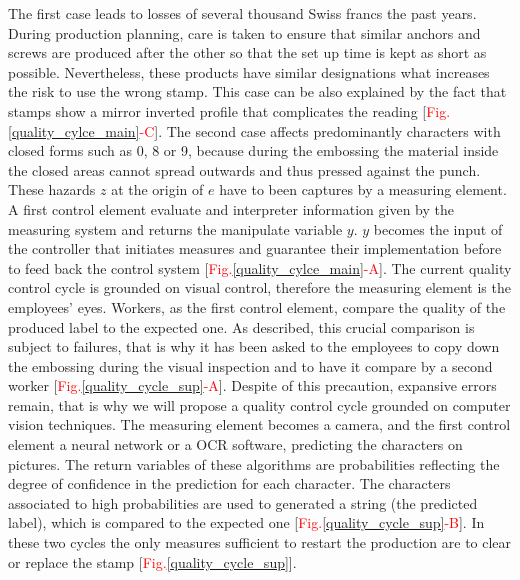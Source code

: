 \documentclass[12pt, french, a4paper]{article} %
\begin{document}
The first case leads to losses of several thousand Swiss francs the past years. During production planning, care is taken to ensure that similar anchors and screws are produced after the other so that the set up time is kept as short as possible. Nevertheless, these products have similar designations what increases the risk to use the wrong stamp. This case can be also explained by the fact that stamps show a mirror inverted profile that complicates the reading [\textcolor{red}{Fig.}\ref{quality_cylce_main}\textcolor{red}{-C}]. The second case affects predominantly characters with closed forms such as 0, 8 or 9, because during the embossing the material inside the closed areas cannot spread outwards and thus pressed against the punch. These hazards $z$ at the origin of $e$ have to been captures by a measuring element. A first control element evaluate and interpreter information given by the measuring system and returns the manipulate variable $y$. $y$ becomes the input of the controller that initiates measures and guarantee their implementation before to feed back the control system [\textcolor{red}{Fig.}\ref{quality_cylce_main}\textcolor{red}{-A}]. The current quality control cycle is grounded on visual control, therefore the measuring element is the employees' eyes. Workers, as the first control element, compare the quality of the produced label to the expected one. As described, this crucial comparison is subject to failures, that is why it has been asked to the employees to copy down the embossing during the visual inspection and to have it compare by a second worker [\textcolor{red}{Fig.}\ref{quality_cycle_sup}\textcolor{red}{-A}]. Despite of this precaution, expansive errors remain, that is why we will propose a quality control cycle grounded on computer vision techniques. The measuring element becomes a camera, and the first control element a neural network or a \gls{OCR} software, predicting the characters on pictures. The return variables of these algorithms are probabilities reflecting the degree of confidence in the prediction for each character. The characters associated to high probabilities are used to generated a string (the predicted label), which is compared to the expected one [\textcolor{red}{Fig.}\ref{quality_cycle_sup}\textcolor{red}{-B}]. In these two cycles the only measures sufficient to restart the production are to clear or replace the stamp [\textcolor{red}{Fig.}\ref{quality_cycle_sup}].\\
\end{document}
